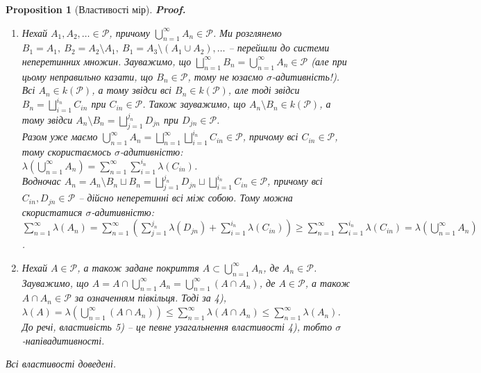 \documentclass[a4paper, 10pt]{article}
\makeatletter
\theoremstyle{theoremdd}
\newtheorem{proposition}[theorem]{Proposition}
\renewenvironment{proof}[1][Proof.\\]{\par
\pushQED{\hfill \qed}%
\normalfont \topsep6\p@\@plus6\p@\relax
\trivlist
\item\relax
{\bfseries
#1\@addpunct{.}}\hspace\labelsep\ignorespaces
}{%
\popQED\endtrivlist\@endpefalse
}
\makeatother
\begin{document}
\begin{proposition}[Властивості мір]
\begin{proof}
\begin{enumerate}[wide=0pt, label={\arabic*)}]
\item Нехай $A_1,A_2,\dots \in \mathcal{P}$, причому $\displaystyle\bigcup_{n=1}^\infty A_n \in \mathcal{P}$. Ми розглянемо $B_1 = A_1,\ B_2 = A_2 \setminus A_1,\ B_1 = A_3 \setminus (A_1 \cup A_2), \dots$ -- перейшли до системи неперетинних множин. Зауважимо, що $\displaystyle\bigsqcup_{n=1}^\infty B_n = \bigcup_{n=1}^\infty A_n \in \mathcal{P}$ (але при цьому неправильно казати, що $B_n \in \mathcal{P}$, тому не юзаємо $\sigma$-адитивність!). Всі $A_n \in k(\mathcal{P})$, а тому звідси всі $B_n \in k(\mathcal{P})$, але тоді звідси $B_n = \displaystyle\bigsqcup_{i=1}^{i_n} C_{in}$ при $C_{in} \in \mathcal{P}$. Також зауважимо, що $A_n \setminus B_n \in k(\mathcal{P})$, а тому звідси $A_n \setminus B_n = \displaystyle\bigsqcup_{j=1}^{j_n} D_{jn}$ при $D_{jn} \in \mathcal{P}$.\\
Разом уже маємо $\displaystyle\bigcup_{n=1}^\infty A_n = \bigsqcup_{n=1}^\infty \bigsqcup_{i=1}^{i_n} C_{in} \in \mathcal{P}$, причому всі $C_{in} \in \mathcal{P}$, тому скористаємось $\sigma$-адитивністю:\\
$\displaystyle\lambda\left( \bigcup_{n=1}^\infty A_n \right) = \sum_{n=1}^\infty \sum_{i=1}^{i_n} \lambda(C_{in})$.\\
Водночас $A_n = A_n \setminus B_n \sqcup B_n = \displaystyle\bigsqcup_{j=1}^{j_n} D_{jn} \sqcup \bigsqcup_{i=1}^{i_n} C_{in} \in \mathcal{P}$, причому всі $C_{in},D_{jn} \in \mathcal{P}$ -- дійсно неперетинні всі між собою. Тому можна скористатися $\sigma$-адитивністю:\\
$\displaystyle\sum_{n=1}^\infty \lambda(A_n) = \sum_{n=1}^\infty \left( \sum_{j=1}^{j_n} \lambda(D_{jn}) + \sum_{i=1}^{i_n} \lambda(C_{in}) \right) \geq \sum_{n=1}^\infty \sum_{i=1}^{i_n} \lambda(C_{in}) = \lambda\left( \bigcup_{n=1}^\infty A_n \right)$.

\item Нехай $A \in \mathcal{P}$, а також задане покриття $A \subset \displaystyle\bigcup_{n=1}^\infty A_n$, де $A_n \in \mathcal{P}$. Зауважимо, що $A = A \cap \displaystyle\bigcup_{n=1}^\infty A_n = \bigcup_{n=1}^\infty (A \cap A_n)$, де $A \in \mathcal{P}$, а також $A \cap A_n \in \mathcal{P}$ за означенням півкільця. Тоді за 4),\\
$\displaystyle\lambda(A) = \lambda\left( \bigcup_{n=1}^\infty (A \cap A_n) \right) \leq \sum_{n=1}^\infty \lambda(A \cap A_n) \leq \sum_{n=1}^\infty \lambda(A_n)$.\\
\textit{До речі, властивість 5) -- це певне узагальнення властивості 4), тобто $\sigma$-напівадитивності.}
\end{enumerate} 
Всі властивості доведені.
\end{proof}
\end{proposition}
\end{document}
